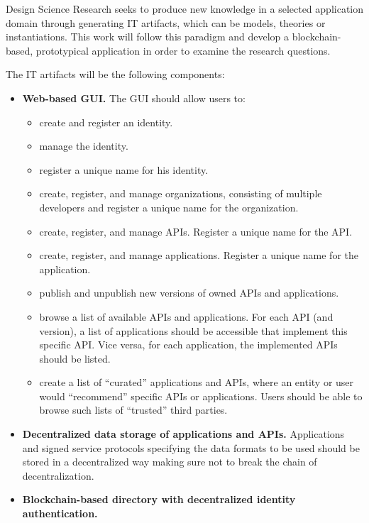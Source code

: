 Design Science Research seeks to produce new knowledge in a selected application domain through generating IT artifacts, which can be models, theories or instantiations. This work will follow this paradigm and develop a blockchain-based, prototypical application in order to examine the research questions. 

The IT artifacts will be the following components: 
\begin{itemize}
    \item \textbf{Web-based GUI.} \newline \newline 
    The GUI should allow users to: 
    \begin{itemize}
        \item {create and register an identity.}
        \item {manage the identity.}
        \item {register a unique name for his identity.}
        \item  {create, register, and manage organizations, consisting of multiple developers and register a unique name for the organization.}
        \item  {create, register, and manage APIs. Register a unique name for the API.} 
        \item {create, register, and manage applications. Register a unique name for the application.}
        \item{publish and unpublish new versions of owned APIs and applications.}
        \item {browse a list of available APIs and applications. For each API (and version), a list of applications should be accessible that implement this specific API. Vice versa, for each application, the implemented APIs should be listed.}
        \item {
        create a list of “curated” applications and APIs, where an entity or user would “recommend” specific APIs or applications. Users should be able to browse such lists of “trusted” third parties.
        }
    \end{itemize}
    \item \textbf{Decentralized data storage of applications and APIs.}  \newline
    Applications and signed service protocols specifying the data formats to be used should be stored in a decentralized way making sure not to break the chain of decentralization. 
    \item \textbf{Blockchain-based directory with decentralized identity authentication.} \newline

\end{itemize}
